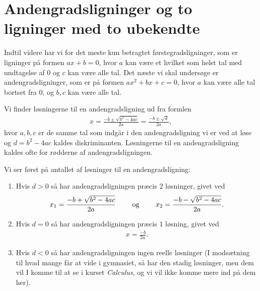 \section{Andengradsligninger og to ligninger med to ubekendte}
Indtil videre har vi for det meste kun betragtet førstegradsligninger, som er ligninger på formen $ax+b=0$, hvor $a$ kan være et hvilket som helst tal med undtagelse af $0$ og $c$ kan være alle tal. Det næste vi skal undersøge er andengradsligninger, som er på formen $ax^2+bx+c=0$, hvor $a$ kan være alle tal bortset fra $0$, og $b,c$ kan være alle tal.

Vi finder løsningerne til en andengradsligning ud fra formlen
\begin{align*}
x = \frac{-b \pm \sqrt{b^2-4ac}}{2a} = \frac{-b \pm \sqrt{d}}{2a},
\end{align*}
hvor $a,b,c$ er de samme tal som indgår i den andengradsligning vi er ved at løse og $d=b^2-4ac$ kaldes diskriminanten. Løsningerne til en andengradsligning kaldes ofte for rødderne af andengradsligningen. 

Vi ser først på antallet af løsninger til en andengradsligning:
\begin{enumerate}
\item Hvis $d>0$ så har andengradsligningen præcis $2$ løsninger, givet ved
\begin{align*}
x_1 = \frac{-b+\sqrt{b^2-4ac}}{2a} \qquad \textup{ og } \qquad x_2=\frac{-b - \sqrt{b^2-4ac}}{2a}.
\end{align*}
\item Hvis $d=0$ så har andengradsligningen præcis $1$ løsning, givet ved
\begin{align*}
x = \frac{-b}{2a}.
\end{align*}
\item Hvis $d<0$ så har andengradsligningen ingen reelle løsninger (I modsætning til hvad mange får at vide i gymnasiet, så har den stadig løsninger, men dem vil I komme til at se i kurset \emph{Calculus}, og vi vil ikke komme mere ind på dem her).
\end{enumerate}

